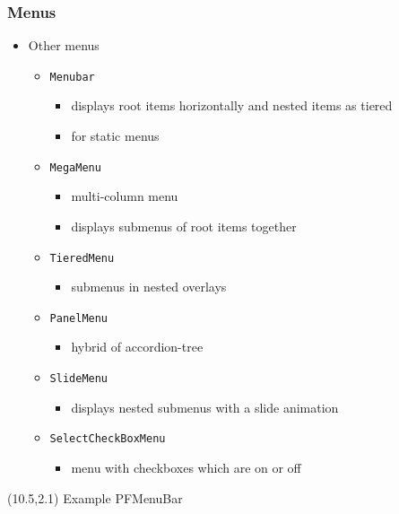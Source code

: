 \documentclass[10pt,xcolor=pdflatex]{beamer}
\begin{document}
\begin{frame}\frametitle{Menus}
  \begin{itemize}
    \item Other menus
	  \begin{itemize}
        \item \texttt{Menubar}
	      \begin{itemize}
            \item displays root items horizontally and nested items as tiered
		    \item for static menus
	      \end{itemize}
        \item \texttt{MegaMenu}
          \begin{itemize}
            \item multi-column menu
            \item displays submenus of root items together
          \end{itemize}
        \item \texttt{TieredMenu}
          \begin{itemize}
            \item submenus in nested overlays
          \end{itemize}
        \item \texttt{PanelMenu}
          \begin{itemize}
            \item hybrid of accordion-tree
          \end{itemize}
		\item \texttt{SlideMenu}
          \begin{itemize}
            \item displays nested submenus with a slide animation
          \end{itemize}
		\item \texttt{SelectCheckBoxMenu}
          \begin{itemize}
            \item menu with checkboxes which are on or off
          \end{itemize}
	  \end{itemize}
  \end{itemize}
\begin{textblock}{10}(10.5,2.1)
    {\footnotesize Example PFMenuBar}
\end{textblock}
\end{frame}
\end{document}
